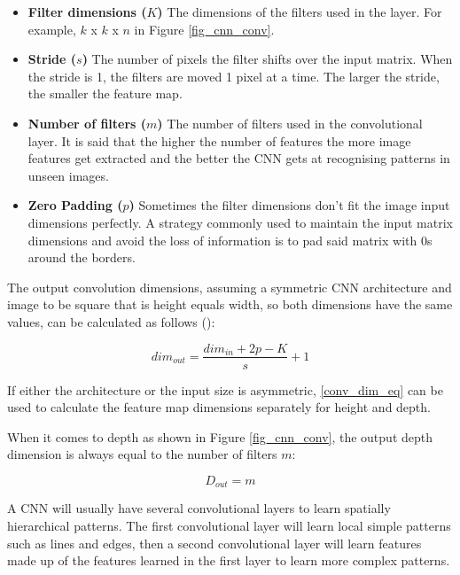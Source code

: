 \begin{itemize}
    \item \textbf{Filter dimensions ($K$)} The dimensions of the filters used in the layer. For example, $k$ x $k$ x $n$ in Figure \ref{fig_cnn_conv}.
    \item \textbf{Stride ($s$)} The number of pixels the filter shifts over the input matrix. When the stride is 1, the filters are moved 1 pixel at a time. The larger the stride, the smaller the feature map.
    \item \textbf{Number of filters ($m$)} The number of filters used in the convolutional layer. It is said that the higher the number of features the more image features get extracted and the better the \gls{CNN} gets at recognising patterns in unseen images.
    \item \textbf{Zero Padding ($p$)} Sometimes the filter dimensions don't fit the image input dimensions perfectly. A strategy commonly used to maintain the input matrix dimensions and avoid the loss of information is to pad said matrix with 0s around the borders.
\end{itemize}
  
The output convolution dimensions, assuming a symmetric \gls{CNN} architecture and image to be square that is height equals width, so both dimensions have the same values, can be calculated as follows (\cite{dumoulin2018guide}):

\begin{equation}
    \label{conv_dim_eq}
    dim_{out} = \frac{dim_{in} + 2p - K}{s} + 1
\end{equation}

If either the architecture or the input size is asymmetric, \ref{conv_dim_eq} can be used to calculate the feature map dimensions separately for height and depth.

When it comes to depth as shown in Figure \ref{fig_cnn_conv}, the output depth dimension is always equal to the number of filters $m$:

\begin{equation}
    \label{conv_depth_eq}
    D_{out} = m
\end{equation}

A \gls{CNN} will usually have several convolutional layers to learn spatially hierarchical patterns. The first convolutional layer will learn local simple patterns such as lines and edges, then a second convolutional layer will learn features made up of the features learned in the first layer to learn more complex patterns. 

